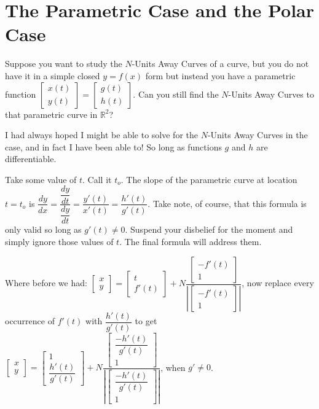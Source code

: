 \newcommand{\finalFormula}{


}

\section{The Parametric Case and the Polar Case}

Suppose you want to study the $N$-Units Away Curves of a curve, but you do not have it in a simple closed $y = f(x)$ form but instead you have a parametric function $
\begin{bmatrix}
  x(t) \\
  y(t)
\end{bmatrix} =
\begin{bmatrix}
  g(t) \\
  h(t)
\end{bmatrix} $. Can you still find the $N$-Units Away Curves to that parametric curve in $\mathbb{R}^2$?

I had always hoped I might be able to solve for the $N$-Units Away Curves in the case, and in fact I have been able to! So long as functions $g$ and $h$ are differentiable.

Take some value of $t$. Call it $t_o$. The slope of the parametric curve at location $t = t_o$ is $ \dfrac{dy}{dx} =
\dfrac{\dfrac{dy}{dt}}{\dfrac{dy}{dt}} = \dfrac{y'(t)}{x'(t)} = \dfrac{h'(t)}{g'(t)} $. Take note, of course, that this formula is only valid so long as $g'(t) \neq 0$. Suspend your disbelief for the moment and simply ignore those values of $t$. The final formula will address them.

Where before we had: $\begin{bmatrix} x \\ y \end{bmatrix} = \begin{bmatrix} t \\ f'(t) \end{bmatrix} + N \dfrac{\begin{bmatrix} -f'(t) \\ 1 \end{bmatrix}}{|\begin{bmatrix} -f'(t) \\ 1 \end{bmatrix}|}$, now replace every occurrence of $f'(t)$ with $\dfrac{h'(t)}{g'(t)}$ to get $\begin{bmatrix} x \\ y \end{bmatrix} = \begin{bmatrix} 1 \\ \dfrac{h'(t)}{g'(t)} \end{bmatrix} + N \dfrac{\begin{bmatrix} \dfrac{-h'(t)}{g'(t)} \\ 1 \end{bmatrix}}{\left| \begin{bmatrix} \dfrac{-h'(t)}{g'(t)} \\ 1 \end{bmatrix} \right|}$, when $g' \neq 0$.

